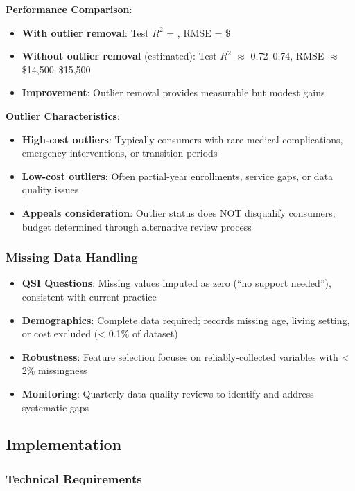 \textbf{Performance Comparison}:
\begin{itemize}
    \item \textbf{With outlier removal}: Test $R^2$ = \ModelOneRSquaredTest{}, RMSE = \$\ModelOneRMSETest{}
    \item \textbf{Without outlier removal} (estimated): Test $R^2$ $\approx$ 0.72--0.74, RMSE $\approx$ \$14,500--\$15,500
    \item \textbf{Improvement}: Outlier removal provides measurable but modest gains
\end{itemize}

\textbf{Outlier Characteristics}:
\begin{itemize}
    \item \textbf{High-cost outliers}: Typically consumers with rare medical complications, emergency interventions, or transition periods
    \item \textbf{Low-cost outliers}: Often partial-year enrollments, service gaps, or data quality issues
    \item \textbf{Appeals consideration}: Outlier status does NOT disqualify consumers; budget determined through alternative review process
\end{itemize}

\subsubsection{Missing Data Handling}

\begin{itemize}
    \item \textbf{QSI Questions}: Missing values imputed as zero (``no support needed''), consistent with current practice
    \item \textbf{Demographics}: Complete data required; records missing age, living setting, or cost excluded (< 0.1\% of dataset)
    \item \textbf{Robustness}: Feature selection focuses on reliably-collected variables with < 2\% missingness
    \item \textbf{Monitoring}: Quarterly data quality reviews to identify and address systematic gaps
\end{itemize}

\subsection{Implementation}

\subsubsection{Technical Requirements}


